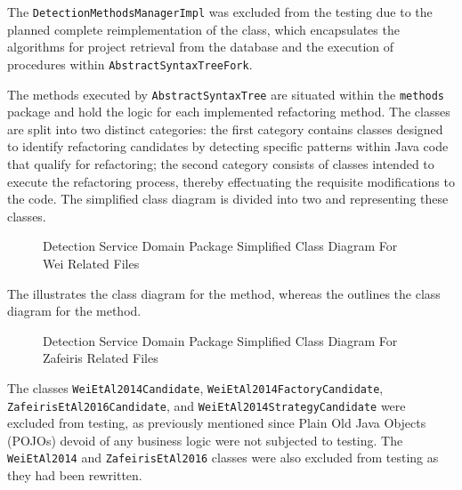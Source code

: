 The \texttt{DetectionMethodsManagerImpl} was excluded from the testing due to the planned complete reimplementation of the class, which encapsulates the algorithms for project retrieval from the database and the execution of procedures within \texttt{AbstractSyntaxTreeFork}.

The methods executed by \texttt{AbstractSyntaxTree} are situated within the \texttt{methods} package and hold the logic for each implemented refactoring method. The classes are split into two distinct categories: the first category contains classes designed to identify refactoring candidates by detecting specific patterns within Java code that qualify for refactoring; the second category consists of classes intended to execute the refactoring process, thereby effectuating the requisite modifications to the code. The simplified class diagram is divided into two  and  representing these classes.

\begin{figure}[ht!]
\SetCaptionWidth{\textwidth}
\caption{Detection Service Domain Package Simplified Class Diagram For Wei Related Files}
\label{fig-class-detection-domain-wei}
\fontsize{4}{5}\selectfont

\end{figure}
\FloatBarrier

The  illustrates the class diagram for the \cite{Liu2014} method, whereas the  outlines the class diagram for the \cite{zafeiris2017automated} method.

\begin{figure}[ht!]
\SetCaptionWidth{\textwidth}
\caption{Detection Service Domain Package Simplified Class Diagram For Zafeiris Related Files}
\label{fig-class-detection-domain-zafeiris}
\fontsize{5}{8}\selectfont

\end{figure}
\FloatBarrier

The classes \texttt{WeiEtAl2014Candidate}, \texttt{WeiEtAl2014FactoryCandidate}, \texttt{ZafeirisEtAl2016Candidate}, and \texttt{WeiEtAl2014StrategyCandidate} were excluded from testing, as previously mentioned since Plain Old Java Objects (POJOs) devoid of any business logic were not subjected to testing. The \texttt{WeiEtAl2014} and \texttt{ZafeirisEtAl2016} classes were also excluded from testing as they had been rewritten.


